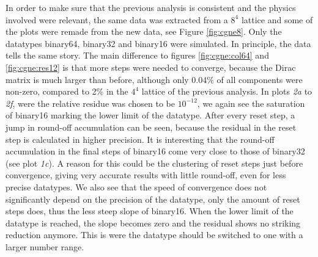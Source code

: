 \documentclass{article}
\theoremstyle{plain} %
\theoremstyle{convention} %
\theoremstyle{remark} %
\numberwithin{equation}{section}
\begin{document}
In order to make sure that the previous analysis is consistent and the physics involved were relevant, the same data was extracted from a $8^4$ lattice and some of the plots were remade from the new data, see Figure \ref{fig:cgne8}. Only the datatypes \gls{binary64}, \gls{binary32} and \gls{binary16} were simulated. In principle, the data tells the same story. The main difference to figures \ref{fig:cgne:col64} and \ref{fig:cgne:res12} is that more steps were needed to converge, because the Dirac matrix is much larger than before, although only \num{0.04}\% of all components were non-zero, compared to \num{2}\% in the $4^4$ lattice of the previous analysis. In plots \textit{2a} to \textit{2f}, were the relative residue was chosen to be $10^{-12}$, we again see the saturation of \gls{binary16} marking the lower limit of the datatype. After every reset step, a jump in round-off accumulation can be seen, because the residual in the reset step is calculated in higher precision. It is interesting that the round-off accumulation in the final steps of \gls{binary16} come very close to those of \gls{binary32} (see plot \textit{1c}). A reason for this could be the clustering of reset steps just before convergence, giving very accurate results with little round-off, even for less precise datatypes. We also see that the speed of convergence does not significantly depend on the precision of the datatype, only the amount of reset steps does, thus the less steep slope of \gls{binary16}. When the lower limit of the datatype is reached, the slope becomes zero and the residual shows no striking reduction anymore. This is were the datatype should be switched to one with a larger number range.
\end{document}
